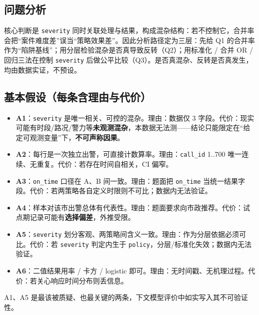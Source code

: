 \documentclass[12pt,a4paper]{ctexart}
\begin{document}
\subsection{问题分析}
核心判断是 \texttt{severity} 同时关联处理与结果，构成混杂结构：若不控制它，合并率会把``案件难度差''误当``策略效果差''。因此分析路径定为三层：先给 Q1 的合并率作为``陷阱基线''；用分层检验混杂是否真导致反转（Q2）；用标准化 / 合并 OR / 回归三法在控制 \texttt{severity} 后做公平比较（Q3）。是否真混杂、反转是否真发生，均由数据实证，不预设。

\subsection{基本假设（每条含理由与代价）}
\begin{itemize}
\item \textbf{A1}：\texttt{severity} 是唯一相关、可控的混杂。理由：数据仅 3 字段。代价：现实可能有时段/路况/警力等\textbf{未观测混杂}，本数据无法测——结论只能限定在``给定可观测变量''下，\textbf{不可声称因果}。
\item \textbf{A2}：每行是一次独立出警，可直接计数算率。理由：\texttt{call\_id} 1..700 唯一连续、无重复。代价：若存在时间自相关，CI 偏窄。
\item \textbf{A3}：\texttt{on\_time} 口径在 A、B 间一致。理由：题面把 \texttt{on\_time} 当统一结果字段。代价：若两策略各自定义时限则不可比；数据内无法验证。
\item \textbf{A4}：样本对该市出警总体有代表性。理由：题面要求向市政推荐。代价：试点期记录可能有\textbf{选择偏差}，外推受限。
\item \textbf{A5}：\texttt{severity} 划分客观、两策略间含义一致。理由：作为分层依据必须可比。代价：若 \texttt{severity} 判定内生于 \texttt{policy}，分层/标准化失效；数据内无法验证。
\item \textbf{A6}：二值结果用率 / 卡方 / logistic 即可。理由：无时间戳、无机理过程。代价：若关心响应时间分布则丢信息。
\end{itemize}
A1、A5 是最该被质疑、也最关键的两条，下文模型评价中如实写入其不可验证性。
\end{document}
